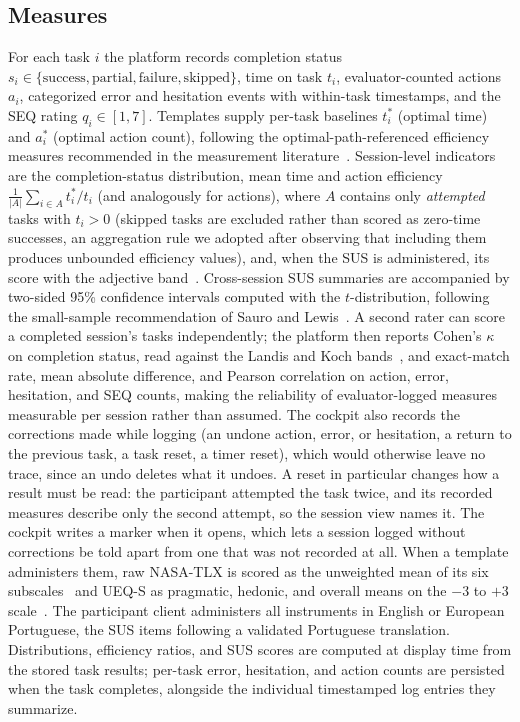 \documentclass[conference]{IEEEtran}
\begin{document}
\subsection{Measures}
For each task $i$ the platform records completion status
$s_i \in \{\text{success},\text{partial},\text{failure},\text{skipped}\}$,
time on task $t_i$, evaluator-counted actions $a_i$, categorized error and
hesitation events with within-task timestamps, and the SEQ rating
$q_i \in [1,7]$. Templates supply per-task baselines $t^{*}_i$ (optimal
time) and $a^{*}_i$ (optimal action count), following the
optimal-path-referenced efficiency measures recommended in the
measurement literature~\cite{albert2022measuring,sauro2016quantifying}.
Session-level indicators are the completion-status distribution, mean
time and action efficiency
$\frac{1}{|A|}\sum_{i \in A} t^{*}_i / t_i$ (and analogously for
actions), where $A$ contains only \emph{attempted} tasks with
$t_i > 0$ (skipped tasks are excluded rather than scored as zero-time
successes, an aggregation rule we adopted after observing that including
them produces unbounded efficiency values), and, when the SUS is
administered, its score with the adjective
band~\cite{brooke1996sus,bangor2009determining}. Cross-session
SUS summaries are accompanied by two-sided 95\% confidence intervals
computed with the $t$-distribution, following the small-sample
recommendation of Sauro and Lewis~\cite{sauro2016quantifying}. A
second rater can score a completed session's tasks independently; the
platform then reports Cohen's $\kappa$~\cite{cohen1960kappa} on
completion status, read against the Landis and Koch
bands~\cite{landis1977measurement}, and exact-match rate, mean absolute
difference, and Pearson correlation on action, error, hesitation, and
SEQ counts, making the reliability of evaluator-logged measures
measurable per session rather than assumed. The cockpit also records the
corrections made while logging (an undone action, error, or hesitation, a
return to the previous task, a task reset, a timer reset), which would
otherwise leave no trace, since an undo deletes what it undoes. A reset in
particular changes how a result must be read: the participant attempted the
task twice, and its recorded measures describe only the second attempt, so
the session view names it. The cockpit writes a marker when it opens, which
lets a session logged without corrections be told apart from one that was
not recorded at all. When a
template administers them, raw NASA-TLX is scored as the unweighted mean
of its six subscales~\cite{hart2006nasatlx} and UEQ-S as pragmatic,
hedonic, and overall means on the $-3$ to $+3$
scale~\cite{schrepp2017ueqs}. The participant client administers all
instruments in English or European Portuguese, the SUS items following
a validated Portuguese translation.
Distributions, efficiency ratios, and SUS scores are computed at display
time from the stored task results; per-task error, hesitation, and action
counts are persisted when the task completes, alongside the individual
timestamped log entries they summarize.
\end{document}
